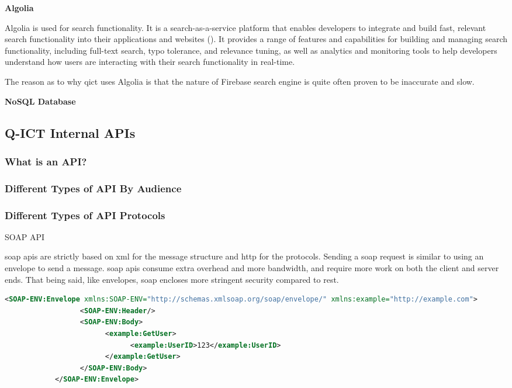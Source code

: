 \begin{multicols}{2}
      \textbf{Algolia}

      Algolia is used for search functionality. It is a search-as-a-service platform that enables developers to
      integrate and build fast, relevant search functionality into their applications and websites (\cite{algolia}).
      It provides a range of features and capabilities for building and managing search functionality, including
      full-text search, typo tolerance, and relevance tuning, as well as analytics and monitoring tools to help
      developers understand how users are interacting with their search functionality in real-time.

      The reason as to why \acrshort{qict} uses Algolia is that the nature of Firebase search engine is quite often
      proven to be inaccurate and slow.

      \textbf{NoSQL Database}

      \subsection{Q-ICT Internal APIs}
      \subsubsection{What is an API?}

      \subsubsection{Different Types of API By Audience}
      \subsubsection{Different Types of API Protocols}\label{chap:typesofapis}
      SOAP API

      \acrshort{soap} \acrshort{api}s are strictly based on \acrshort{xml} for the message structure and 
      \acrshort{http} for the protocols. Sending a \acrshort{soap} request is similar to using an envelope 
      to send a message. \acrshort{soap} \acrshort{api}s consume extra overhead and more bandwidth, and 
      require more work on both the client and server ends. That being said, like envelopes, \acrshort{soap} 
      encloses more stringent security compared to \acrshort{rest}.
      \end{multicols}
      
      \begin{lstlisting}[language=XML, caption=Example of a SOAP request, label=lst:soaprequest]
            <SOAP-ENV:Envelope xmlns:SOAP-ENV="http://schemas.xmlsoap.org/soap/envelope/" xmlns:example="http://example.com">
                  <SOAP-ENV:Header/>
                  <SOAP-ENV:Body>
                        <example:GetUser>
                              <example:UserID>123</example:UserID>
                        </example:GetUser>
                  </SOAP-ENV:Body>
            </SOAP-ENV:Envelope>
      \end{lstlisting}
 
